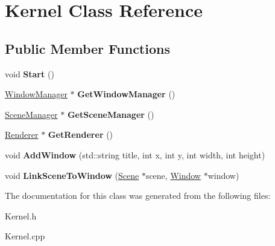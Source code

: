 \hypertarget{class_kernel}{\section{Kernel Class Reference}
\label{class_kernel}
}
\subsection*{Public Member Functions}
\begin{DoxyCompactItemize}
\item 
\hypertarget{class_kernel_afc4792b78aa8e647e386ff13413cd6f6}{void {\bfseries Start} ()}\label{class_kernel_afc4792b78aa8e647e386ff13413cd6f6}

\item 
\hypertarget{class_kernel_a6259c2b4992e0d3780ba3f357e4e4325}{\hyperlink{class_window_manager}{Window\-Manager} $\ast$ {\bfseries Get\-Window\-Manager} ()}\label{class_kernel_a6259c2b4992e0d3780ba3f357e4e4325}

\item 
\hypertarget{class_kernel_a5eb8a039aaf6270d9bb6851029f498fb}{\hyperlink{class_scene_manager}{Scene\-Manager} $\ast$ {\bfseries Get\-Scene\-Manager} ()}\label{class_kernel_a5eb8a039aaf6270d9bb6851029f498fb}

\item 
\hypertarget{class_kernel_a9432fddb70c6fd32dc34a3cf75226e7d}{\hyperlink{class_renderer}{Renderer} $\ast$ {\bfseries Get\-Renderer} ()}\label{class_kernel_a9432fddb70c6fd32dc34a3cf75226e7d}

\item 
\hypertarget{class_kernel_af6dfc57a005889f252e469a3f7e539a8}{void {\bfseries Add\-Window} (std\-::string title, int x, int y, int width, int height)}\label{class_kernel_af6dfc57a005889f252e469a3f7e539a8}

\item 
\hypertarget{class_kernel_a39546c9c22bf21bbbeb8d45917720ffa}{void {\bfseries Link\-Scene\-To\-Window} (\hyperlink{class_scene}{Scene} $\ast$scene, \hyperlink{class_window}{Window} $\ast$window)}\label{class_kernel_a39546c9c22bf21bbbeb8d45917720ffa}

\end{DoxyCompactItemize}


The documentation for this class was generated from the following files\-:\begin{DoxyCompactItemize}
\item 
Kernel.\-h\item 
Kernel.\-cpp\end{DoxyCompactItemize}
